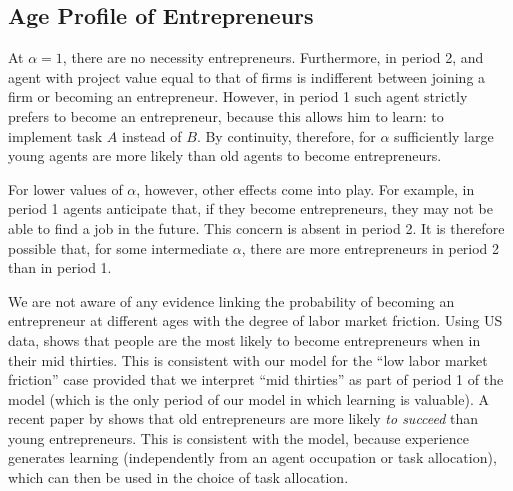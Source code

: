 \documentclass[12pt,american]{paper}
\theoremstyle{remark}
\begin{document}
\subsection{Age Profile of Entrepreneurs}
At $\alpha=1$, there are no necessity entrepreneurs. Furthermore, in period 2, and agent with project value equal to that of firms is indifferent between joining a firm or becoming an entrepreneur. However, in period 1 such agent strictly prefers to become an entrepreneur, because this allows him to learn: to implement task $A$ instead of $B$. 
By continuity, therefore, for $\alpha$ sufficiently large young agents are more likely than old agents to become entrepreneurs.


%
For lower values of $\alpha$, however,  other effects come into play. %
For example, in period 1 agents anticipate that, if they become entrepreneurs, they may not be able to find a job in the future. This concern is absent in period 2. It is therefore possible that, for some intermediate $\alpha$, there are more entrepreneurs in period 2 than in period 1. 

We are not aware of any evidence linking  the probability of becoming an entrepreneur at different ages with the degree of labor market friction. Using US data, \cite{Hincapie2020} shows that people are the most likely to become entrepreneurs when in their mid thirties.  This is consistent with our model for the ``low labor market friction'' case provided that we interpret ``mid thirties'' as part of  period 1 of the model (which is the only period of our model in which learning is valuable).
A  recent  paper by \cite*{Azoulay2020} shows that old entrepreneurs are more likely \textit{to succeed} than young entrepreneurs. This is consistent with the model, because experience generates learning (independently from an agent occupation or task allocation), which can then be used in the choice of task allocation.
\end{document}
